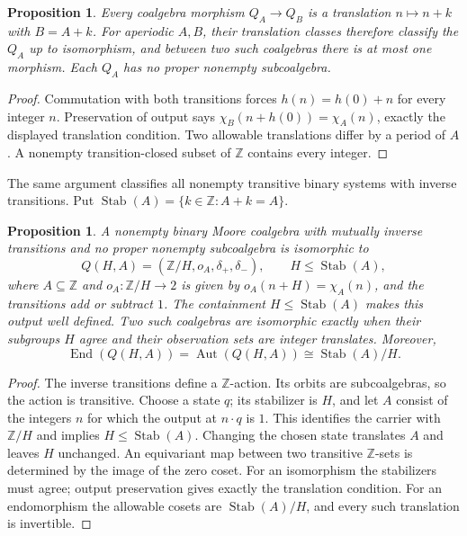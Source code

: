 \documentclass[11pt]{article}
\newtheorem{proposition}[theorem]{Proposition}
\theoremstyle{definition}
\newcommand{\Z}{\mathbb Z}
\begin{document}
\begin{proposition}\label{prop:shift}
Every coalgebra morphism $Q_A\to Q_B$ is a translation $n\mapsto n+k$
with $B=A+k$. For aperiodic $A,B$, their translation classes therefore
classify the $Q_A$ up to isomorphism, and between two such coalgebras there is at
most one morphism. Each $Q_A$ has no proper nonempty subcoalgebra.
\end{proposition}
\begin{proof}
Commutation with both transitions forces $h(n)=h(0)+n$ for every
integer $n$. Preservation of output says
$\chi_B(n+h(0))=\chi_A(n)$, exactly the displayed translation
condition. Two allowable translations differ by a period of $A$.
A nonempty transition-closed subset of $\Z$ contains every integer.
\end{proof}

The same argument classifies all nonempty transitive binary systems
with inverse transitions. Put
$\operatorname{Stab}(A)=\{k\in\Z:A+k=A\}$.
\begin{proposition}\label{prop:transitive}
A nonempty binary Moore coalgebra with mutually inverse transitions
and no proper nonempty subcoalgebra is isomorphic to
\[
 Q(H,A)=(\Z/H,o_A,\delta_+,\delta_-),
 \qquad H\leq\operatorname{Stab}(A),
\]
where $A\subseteq\Z$ and $o_A:\Z/H\to2$ is given by $o_A(n+H)=\chi_A(n)$,
and the transitions add or subtract $1$. The containment
$H\leq\operatorname{Stab}(A)$ makes this output well defined.
Two such coalgebras are
isomorphic exactly when their subgroups $H$ agree and their observation
sets are integer translates. Moreover,
\[
 \operatorname{End}(Q(H,A))=\operatorname{Aut}(Q(H,A))
       \cong\operatorname{Stab}(A)/H.
\]
\end{proposition}
\begin{proof}
The inverse transitions define a $\Z$-action. Its orbits are
subcoalgebras, so the action is transitive. Choose a state $q$;
its stabilizer is $H$, and let $A$ consist of the integers $n$ for
which the output at $n\cdot q$ is $1$. This identifies the carrier
with $\Z/H$ and implies $H\leq\operatorname{Stab}(A)$.
Changing the chosen state translates $A$ and leaves $H$ unchanged.
An equivariant map between two transitive $\Z$-sets is determined
by the image of the zero coset. For an isomorphism the stabilizers
must agree; output preservation gives exactly the translation
condition. For an endomorphism the allowable cosets are
$\operatorname{Stab}(A)/H$, and every such translation is invertible.
\end{proof}
\end{document}
